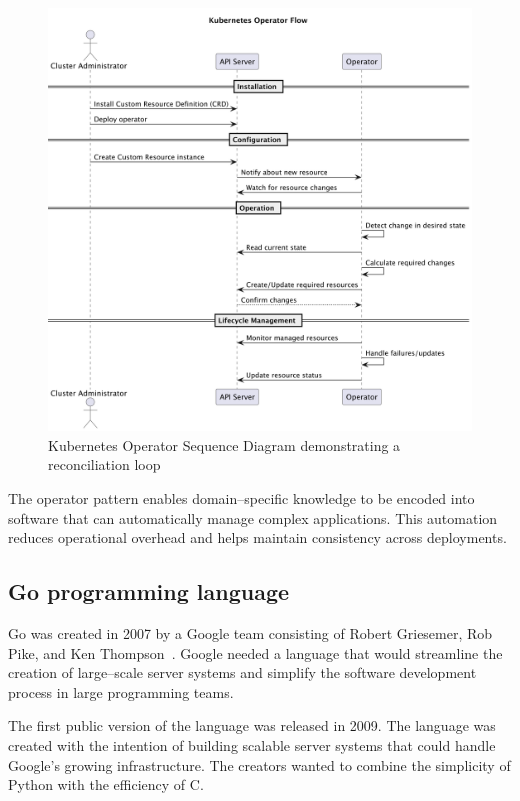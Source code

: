 \begin{figure}[htbp]
    \centering
    \includegraphics[width=\textwidth]{images/kubernetes_operator_flow}
    \caption{Kubernetes Operator Sequence Diagram demonstrating a reconciliation loop}
    \label{fig:kubernetes-operator-flow}
\end{figure}

The operator pattern enables domain--specific knowledge to be encoded into software that can automatically manage complex applications.
This automation reduces operational overhead and helps maintain consistency across deployments.

\subsection{Go programming language}\label{subsec:go-programming-language}

Go was created in 2007 by a Google team consisting of Robert Griesemer, Rob Pike, and Ken Thompson~\cite{golang}.
Google needed a language that would streamline the creation of large--scale server systems and simplify the software development process in large programming teams.

The first public version of the language was released in 2009.
The language was created with the intention of building scalable server systems that could handle Google's growing infrastructure.
The creators wanted to combine the simplicity of Python with the efficiency of C\@.

